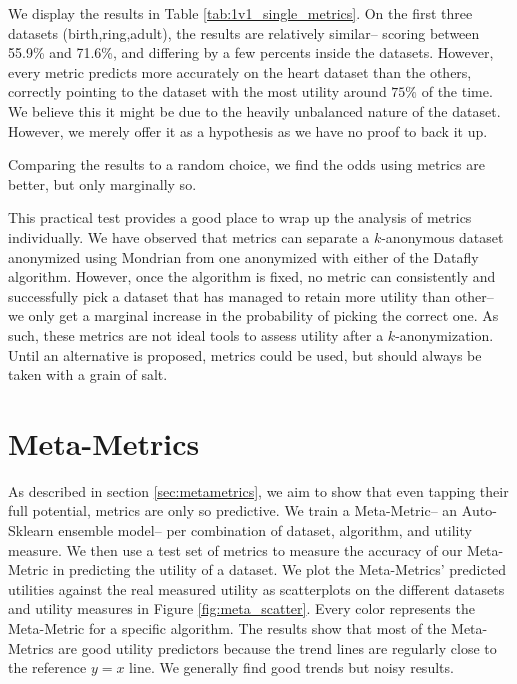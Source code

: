 We display the results in Table \ref{tab:1v1_single_metrics}. On the first three datasets (birth,ring,adult), the results are relatively similar-- scoring between 55.9\% and 71.6\%, and differing by a few percents inside the datasets. However, every metric predicts more accurately on the heart dataset than the others, correctly pointing to the dataset with the most utility around $75\%$ of the time. We believe this it might be due to the heavily unbalanced nature of the dataset. However, we merely offer it as a hypothesis as we have no proof to back it up.

Comparing the results to a random choice, we find the odds using metrics are better, but only marginally so.

This practical test provides a good place to wrap up the analysis of metrics individually. We have observed that metrics can separate a $k$-anonymous dataset anonymized using Mondrian from one anonymized with either of the Datafly algorithm. However, once the algorithm is fixed, no metric can consistently and successfully pick a dataset that has managed to retain more utility than other-- we only get a marginal increase in the probability of picking the correct one. As such, these metrics are not ideal tools to assess utility after a $k$-anonymization. Until an alternative is proposed, metrics could be used, but should always be taken with a grain of salt.


\section{Meta-Metrics}
As described in section \ref{sec:metametrics}, we aim to show that even tapping their full potential, metrics are only so predictive. We train a Meta-Metric-- an Auto-Sklearn ensemble model-- per combination of dataset, algorithm, and utility measure. We then use a test set of metrics to measure the accuracy of our Meta-Metric in predicting the utility of a dataset. We plot the Meta-Metrics' predicted utilities against the real measured utility as scatterplots on the different datasets and utility measures in Figure \ref{fig:meta_scatter}. Every color represents the Meta-Metric for a specific algorithm. The results show that most of the Meta-Metrics are good utility predictors because the trend lines are regularly close to the reference $y=x$ line. We generally find good trends but noisy results. 

